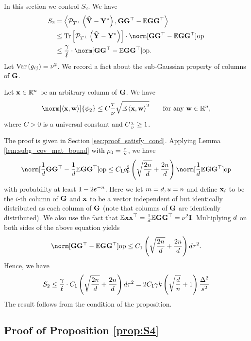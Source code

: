 In this section we control $S_{2}$. We have 
\begin{align*}
S_{2} & =\left\langle \PTperp\left(\Yhat-\Ystar\right),\G\G\t-\E\G\G\t\right\rangle \\
 & \leq\Tr\left[\PTperp\left(\Yhat-\Ystar\right)\right]\cdot\opnorm{\G\G\t-\E\G\G\t}\\
 & \le\frac{\error}{\size}\cdot\opnorm{\G\G\t-\E\G\G\t}.
\end{align*}
Let $\operatorname*{Var}\left(g_{ij}\right)=\nu^{2}$. We record a fact about the
sub-Gaussian property of columns of $\mathbf{G}$. 
\begin{fact}
\label{fact:satisfy_cond_gauss_choas_operator_norm_bound} Let $\mathbf{x}\in\mathbb{R}^{n}$
be an arbitrary column of $\mathbf{G}$. We have 
\[
\norm[\left\langle \x,\w\right\rangle ]{\psi_{2}}\leq C\frac{\sgnorm}{\std}\sqrt{\E\left\langle \x,\w\right\rangle ^{2}}\qquad\text{for any }\w\in\real^{\num},
\]
where $C>0$ is a universal constant and $C\frac{\tau}{\nu}\ge1$.
\end{fact}
The proof is given in Section \ref{sec:proof_satisfy_cond}. Applying
Lemma \ref{lem:subg_cov_mat_bound} with $\rho_{0}=\frac{\tau}{\nu}$,
we have 
\[
\opnorm{\frac{1}{d}\G\G\t-\frac{1}{d}\E\G\G\t}\leq C_{1}\rho_{0}^{2}\left(\sqrt{\frac{2\num}{\vecdim}}+\frac{2\num}{\vecdim}\right)\opnorm{\frac{1}{d}\E\G\G\t}
\]
with probability at least $1-2e^{-n}$. Here we let $m=d,u=n$
and define $\mathbf{x}_{i}$ to be the $i$-th column of $\mathbf{G}$ and $\mathbf{x}$ to
be a vector independent of but identically distributed as each column of $\mathbf{G}$ (note that columns of $\mathbf{G}$ are identically
distributed). We also use the fact that $\mathbb{E}\mathbf{x}\mathbf{x}{\displaystyle ^{\top}}=\frac{1}{d}\mathbb{E}\mathbf{G}\mathbf{G}{\displaystyle ^{\top}}=\nu^{2}\mathbf{I}$.
Multiplying $d$ on both sides of the above equation yields
\[
\opnorm{\G\G\t-\E\G\G\t}\leq C_{1}\left(\sqrt{\frac{2\num}{\vecdim}}+\frac{2\num}{\vecdim}\right)\vecdim\sgnorm^{2}.
\]
Hence, we have 
\[
S_{2}\le\frac{\gamma}{\ell}\cdot C_{1}\left(\sqrt{\frac{2n}{d}}+\frac{2n}{d}\right)d\tau^{2}=2C_{1}\gamma k\left(\sqrt{\frac{d}{n}}+1\right)\frac{\Delta^{2}}{s^{2}}
\]
The result follows from the condition of the proposition.

\subsection{Proof of Proposition \ref{prop:S4} \label{sec:proof_S4}}

